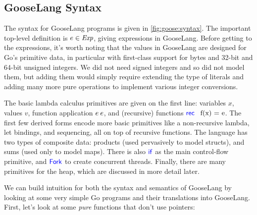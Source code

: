 \subsection{GooseLang Syntax}%
\label{sec:goose:syntax}



The syntax for GooseLang programs is given in \cref{fig:goose:syntax}. The
important top-level definition is $e \in \textit{Exp}$, giving expressions in
GooseLang. Before getting to the expressions, it's worth noting that the values
in GooseLang are designed for Go's primitive data, in particular with
first-class support for bytes and 32-bit and 64-bit unsigned integers. We did
not need signed integers and so did not model them, but adding them would simply
require extending the type of literals and adding many more pure operations to
implement various integer conversions.

The basic lambda calculus primitives are given on the first line: variables $x$,
values $v$, function application $e \: e$, and (recursive) functions $\mbox{\ensuremath{\mathsf{\textcolor{blue}{rec}}} \, f(x) = e}$.
The first few derived forms encode more basic primitives like a non-recursive
lambda, let bindings, and sequencing, all on top of recursive functions. The
language has two types of composite data: products (used pervasively to model
structs), and sums (used only to model maps). There is also $\mathsf{\textcolor{blue}{if}}$ as the
main control-flow primitive, and $\mathsf{\textcolor{blue}{Fork}}$ to create concurrent threads.
Finally, there are many primitives for the heap, which are discussed in more
detail later.

We can build intuition for both the syntax and semantics of GooseLang by looking
at some very simple Go programs and their translations into GooseLang. First,
let's look at some \emph{pure} functions that don't use pointers:

\newcommand{\translaterule}{\rule{0.9\textwidth}{0.5pt}}

\newenvironment{translatego}{
  \noindent
  \translaterule \\[-10pt]
  \begin{minipage}[t]{0.5\textwidth}
  \strut\vspace*{-\baselineskip}
  \setminted[go]{frame=none}
}{
  \end{minipage}
  \setminted[go]{frame=lines}
}

\newenvironment{translategooselang}{
  \begin{minipage}[t]{0.5\textwidth}
  \strut\vspace*{-8pt}
}{
  \end{minipage}
  \\[5pt] \translaterule
}

